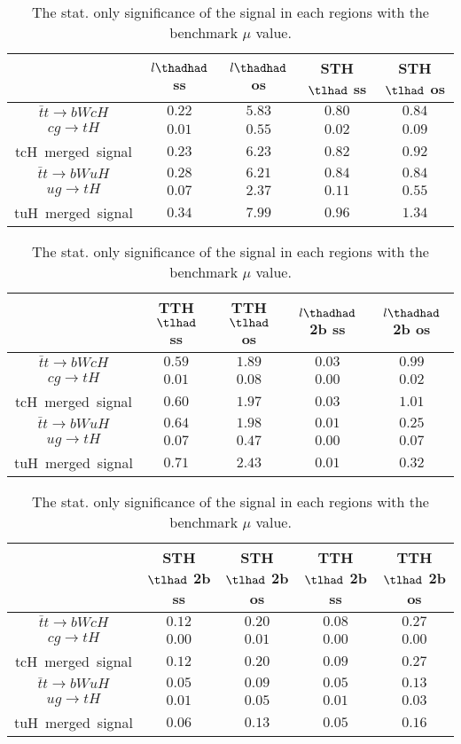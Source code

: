 \begin{table}
\caption{The stat. only significance of the signal in each regions with the benchmark $\mu$ value.}
\centering
\begin{tabular}{|c|c|c|c|c|} \hline
 & $l\thadhad$ ss & $l\thadhad$ os & STH $\tlhad$ ss & STH $\tlhad$ os\\\hline
$\bar{t}t\to bWcH$ & $0.22$ & $5.83$ & $0.80$ & $0.84$\\\hline
$cg\to tH$ & $0.01$ & $0.55$ & $0.02$ & $0.09$\\\hline
tcH~merged~signal & $0.23$ & $6.23$ & $0.82$ & $0.92$\\\hline
$\bar{t}t\to bWuH$ & $0.28$ & $6.21$ & $0.84$ & $0.84$\\\hline
$ug\to tH$ & $0.07$ & $2.37$ & $0.11$ & $0.55$\\\hline
tuH~merged~signal & $0.34$ & $7.99$ & $0.96$ & $1.34$\\\hline
\end{tabular}
\begin{tabular}{|c|c|c|c|c|} \hline
 & TTH $\tlhad$ ss & TTH $\tlhad$ os & $l\thadhad$ 2b ss & $l\thadhad$ 2b os\\\hline
$\bar{t}t\to bWcH$ & $0.59$ & $1.89$ & $0.03$ & $0.99$\\\hline
$cg\to tH$ & $0.01$ & $0.08$ & $0.00$ & $0.02$\\\hline
tcH~merged~signal & $0.60$ & $1.97$ & $0.03$ & $1.01$\\\hline
$\bar{t}t\to bWuH$ & $0.64$ & $1.98$ & $0.01$ & $0.25$\\\hline
$ug\to tH$ & $0.07$ & $0.47$ & $0.00$ & $0.07$\\\hline
tuH~merged~signal & $0.71$ & $2.43$ & $0.01$ & $0.32$\\\hline
\end{tabular}
\begin{tabular}{|c|c|c|c|c|} \hline
 & STH $\tlhad$ 2b ss & STH $\tlhad$ 2b os & TTH $\tlhad$ 2b ss & TTH $\tlhad$ 2b os\\\hline
$\bar{t}t\to bWcH$ & $0.12$ & $0.20$ & $0.08$ & $0.27$\\\hline
$cg\to tH$ & $0.00$ & $0.01$ & $0.00$ & $0.00$\\\hline
tcH~merged~signal & $0.12$ & $0.20$ & $0.09$ & $0.27$\\\hline
$\bar{t}t\to bWuH$ & $0.05$ & $0.09$ & $0.05$ & $0.13$\\\hline
$ug\to tH$ & $0.01$ & $0.05$ & $0.01$ & $0.03$\\\hline
tuH~merged~signal & $0.06$ & $0.13$ & $0.05$ & $0.16$\\\hline
\end{tabular}
\label{tab:significance}
\end{table}
